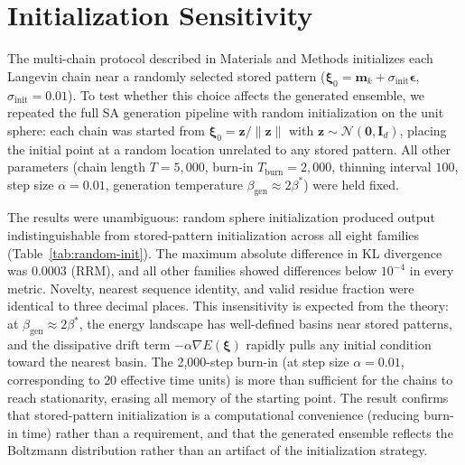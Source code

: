 \section{Initialization Sensitivity}\label{si:random-init}

The multi-chain protocol described in Materials and Methods initializes each Langevin chain near a randomly selected stored pattern ($\boldsymbol{\xi}_0 = \mathbf{m}_k + \sigma_{\mathrm{init}}\boldsymbol{\epsilon}$, $\sigma_{\mathrm{init}} = 0.01$). To test whether this choice affects the generated ensemble, we repeated the full SA generation pipeline with random initialization on the unit sphere: each chain was started from $\boldsymbol{\xi}_0 = \mathbf{z}/\|\mathbf{z}\|$ with $\mathbf{z} \sim \mathcal{N}(\mathbf{0}, \mathbf{I}_d)$, placing the initial point at a random location unrelated to any stored pattern. All other parameters (chain length $T{=}5{,}000$, burn-in $T_{\mathrm{burn}}{=}2{,}000$, thinning interval $100$, step size $\alpha{=}0.01$, generation temperature $\beta_{\mathrm{gen}} \approx 2\beta^*$) were held fixed.

The results were unambiguous: random sphere initialization produced output indistinguishable from stored-pattern initialization across all eight families (Table~\ref{tab:random-init}). The maximum absolute difference in KL divergence was $0.0003$ (RRM), and all other families showed differences below $10^{-4}$ in every metric. Novelty, nearest sequence identity, and valid residue fraction were identical to three decimal places. This insensitivity is expected from the theory: at $\beta_{\mathrm{gen}} \approx 2\beta^*$, the energy landscape has well-defined basins near stored patterns, and the dissipative drift term $-\alpha\nabla E(\boldsymbol{\xi})$ rapidly pulls any initial condition toward the nearest basin. The 2{,}000-step burn-in (at step size $\alpha{=}0.01$, corresponding to $20$ effective time units) is more than sufficient for the chains to reach stationarity, erasing all memory of the starting point. The result confirms that stored-pattern initialization is a computational convenience (reducing burn-in time) rather than a requirement, and that the generated ensemble reflects the Boltzmann distribution rather than an artifact of the initialization strategy.

